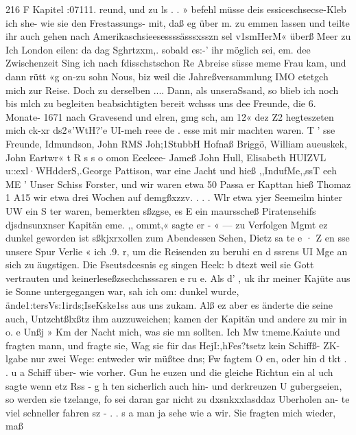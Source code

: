 216
F Kapitel :07111.
reund, und zu ls . . »
befehl müsse deis essiceschsecse-Kleb ich she- wie sie den Frestassungs-
mit, daß eg über m. zu emmen lassen und teilte ihr auch
gehen nach Amerikaschsieesessssässsxsszn sel v1smHerM« überß Meer zu
Ich London eilen: da dag Sghrtzxm,. sobald es:-’ ihr möglich sei,
em. dee Zwischenzeit Sing ich nach fdisschstschon Re Abreise süsse
meme Frau kam, und dann rütt «g on-zu sohn Nous, biz
weil die Jahreßversammlung IMO etetgch mich zur Reise. Doch
zu derselben .... Dann, als unseraSsand, so blieb ich noch bis
mlch zu begleiten beabsichtigten bereit wchsss uns dee Freunde, die
6. Monate- 1671 nach Gravesend und elren, gmg sch, am 12« dez
 Z2 hegteszeten mich ck-xr ds2«’WtH?’e UI-meh reee de
. esse mit mir machten waren. T ' sse Freunde,
Idmundson, John RMS Joh;1StubbH Hofnaß Briggö, William
aueuskek, John Eartwr« t R s s o omon Eeeleee- Jameß
John Hull, Elisabeth HUIZVL u::exl·WHdderS,.George Pattison,
war eine Jacht und hieß ,,IndufMe,,ssT eeh ME ' Unser Schiss
Forster, und wir waren etwa 50 Passa er Kapttan hieß Thomaz
1 A15 wir etwa drei Wochen auf demgßxzzv. . . .
Wlr etwa yjer Seemeilm hinter UW ein S ter waren, bemerkten
sßzgse, es E ein maursscheß Piratensehifs djsdnsunxnser Kapitän
eme. ,, ommt,« sagte er - « — zu Verfolgen
Mgmt ez dunkel geworden ist sßkjxrxollen zum Abendessen Sehen,
Dietz sa te e · Z en sse unsere Spur Verlie «
ich .9. r, um die Reisenden zu beruhi en d ssrens
UI Mge an sich zu äugstigen. Die Fseutsdcesnis eg singen
Heek: b dtezt weil sie Gott vertrauten und keinerleseßzsechchsssaren
e ru e. Als d' , uk ihr
meiner Kajüte aus ie Sonne untergegangen war, sah ich om:
dunkel wurde, ände1:tersVs:1irds;IseKske1ss aus uns zukam. Alß ez
aber es änderte die seine auch, Untzchtßlxßtz   ihm auzzuweichen;
kamen der Kapitän und andere zu mir in o. e Unßj » Km der Nacht
mich, was sie mn sollten. Ich Mw t:neme.Kaiute und fragten
mann, und fragte sie, Wag sie für das HejI:,hFes?tsetz kein Schiffß-
ZK-lgabe nur zwei Wege: entweder wir müßtee dns; Fw fagtem
O en, oder hin d tkt . . u a Schiff über-
wie vorher. Gun he euzen und die gleiche Richtun ein al
uch sagte wenn etz Rss - g h ten
sicherlich auch hin- und derkreuzen U gubergseien, so werden sie
tzelange, fo sei daran gar nicht zu dxsnkxxlasddaz Uberholen an-
te viel schneller fahren sz - . . s a man ja sehe wie
a wir. Sie fragten mich wieder, maß


